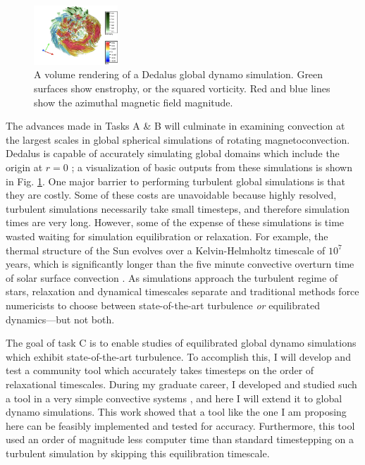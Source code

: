 \documentclass[11pt, preprint]{aastex}
\begin{document}
\begin{figure}
	\begin{center}
	\vspace{-14pt}
    \includegraphics[width=0.28\textwidth]{./figs/mdwarf.png}
	\vspace{-16pt}
	\end{center}
    \caption{A volume rendering of a Dedalus global dynamo simulation.
	Green surfaces show enstrophy, or the squared vorticity.
	Red and blue lines show the azimuthal magnetic field magnitude.
	\label{fig:mdwarf} }
	\vspace{-6pt}
\end{figure}
The advances made in Tasks A \& B will culminate in examining convection at the largest scales in global spherical simulations of rotating magnetoconvection.
Dedalus is capable of accurately simulating global domains which include the origin at $r = 0$ \citep{lecoanet&all2019}; a visualization of basic outputs from these simulations is shown in Fig. \ref{fig:mdwarf}.
One major barrier to performing turbulent global simulations is that they are costly.
Some of these costs are unavoidable because highly resolved, turbulent simulations necessarily take small timesteps, and therefore simulation times are very long.
However, some of the expense of these simulations is time wasted waiting for simulation equilibration or relaxation.
For example, the thermal structure of the Sun evolves over a Kelvin-Helmholtz timescale of $10^7$ years, which is significantly longer than the five minute convective overturn time of solar surface convection \citep{anders&all2018}.
As simulations approach the turbulent regime of stars, relaxation and dynamical timescales separate and traditional methods force numericists to choose between state-of-the-art turbulence \emph{or} equilibrated dynamics---but not both.

The goal of task C is to enable studies of equilibrated global dynamo simulations which exhibit state-of-the-art turbulence.
To accomplish this, I will develop and test a community tool which accurately takes timesteps on the order of relaxational timescales.
During my graduate career, I developed and studied such a tool in a very simple convective systems \citep{anders&all2018}, and here I will extend it to global dynamo simulations.
This work showed that a tool like the one I am proposing here can be feasibly implemented and tested for accuracy.
Furthermore, this tool used an order of magnitude less computer time than standard timestepping on a turbulent simulation by skipping this equilibration timescale.
\end{document}
